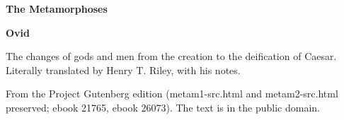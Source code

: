\documentclass[11pt,letterpaper]{article}
\begin{document}
\color{ink}

\begin{titlepage}
\centering
\vspace*{4em}
{\LARGE\bfseries\color{heading} The Metamorphoses\par}
\vspace{2em}
{\Large\bfseries\color{heading} Ovid\par}
\vspace{2.5em}
{\itshape\color{subhead}\parbox{0.8\linewidth}{\centering The changes of gods and men from the creation to the deification of Caesar. Literally translated by Henry T. Riley, with his notes.\par}}
\vfill
{\small From the Project Gutenberg edition (metam1-src.html and metam2-src.html preserved; ebook 21765, ebook 26073). The text is in the public domain.\par}
\vspace{2em}
\end{titlepage}

\tableofcontents


\end{document}
